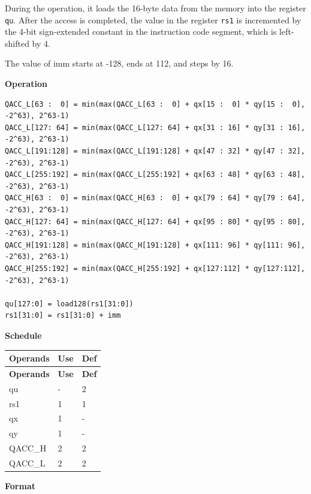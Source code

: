 During the operation, it loads the 16-byte data from the memory into the register \lstinline{qu}. After the access is completed, the value in the register \lstinline{rs1} is incremented by the 4-bit sign-extended constant in the instruction code segment, which is left-shifted by 4.

The value of imm starts at -128, ends at 112, and steps by 16.

\textbf{Operation}\\
\begin{lstlisting}
QACC_L[63 :  0] = min(max(QACC_L[63 :  0] + qx[15 :  0] * qy[15 :  0], -2^63), 2^63-1)
QACC_L[127: 64] = min(max(QACC_L[127: 64] + qx[31 : 16] * qy[31 : 16], -2^63), 2^63-1)
QACC_L[191:128] = min(max(QACC_L[191:128] + qx[47 : 32] * qy[47 : 32], -2^63), 2^63-1)
QACC_L[255:192] = min(max(QACC_L[255:192] + qx[63 : 48] * qy[63 : 48], -2^63), 2^63-1)
QACC_H[63 :  0] = min(max(QACC_H[63 :  0] + qx[79 : 64] * qy[79 : 64], -2^63), 2^63-1)
QACC_H[127: 64] = min(max(QACC_H[127: 64] + qx[95 : 80] * qy[95 : 80], -2^63), 2^63-1)
QACC_H[191:128] = min(max(QACC_H[191:128] + qx[111: 96] * qy[111: 96], -2^63), 2^63-1)
QACC_H[255:192] = min(max(QACC_H[255:192] + qx[127:112] * qy[127:112], -2^63), 2^63-1)

qu[127:0] = load128(rs1[31:0])
rs1[31:0] = rs1[31:0] + imm
\end{lstlisting}

\textbf{Schedule}\\
\begin{longtable}[c]{|l|l|l|}
    \hline
    \rowcolor{lightgray}
    \textbf{Operands} & \textbf{Use} & \textbf{Def} \\\hline
    \endfirsthead
    \hline
    \rowcolor{lightgray}
     \textbf{Operands} & \textbf{Use} & \textbf{Def} \\\hline
    \endhead
    \hline
    \endfoot

    qu & - & 2 \\\hline
    rs1 & 1 & 1 \\\hline
     qx & 1 & - \\\hline
     qy & 1 & - \\\hline
     QACC\_H & 2 & 2 \\\hline
     QACC\_L & 2 & 2

\end{longtable}

\textbf{Format}\\

